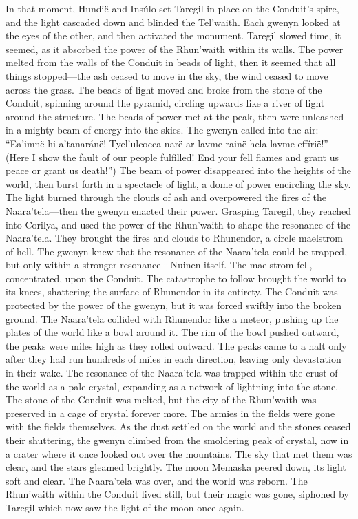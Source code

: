 \documentclass[smalldemyvopaper,11pt,twoside,onecolumn,openright,extrafontsizes]{memoir}
\begin{document}
In that moment, Hundië and Insúlo set Taregil in place on the Conduit’s spire, and the light cascaded down and blinded the Tel’waith. Each gwenyn looked at the eyes of the other, and then activated the monument. Taregil slowed time, it seemed, as it absorbed the power of the Rhun’waith within its walls. The power melted from the walls of the Conduit in beads of light, then it seemed that all things stopped—the ash ceased to move in the sky, the wind ceased to move across the grass. The beads of light moved and broke from the stone of the Conduit, spinning around the pyramid, circling upwards like a river of light around the structure. The beads of power met at the peak, then were unleashed in a mighty beam of energy into the skies. The gwenyn called into the air:
“Ea’imnë hi a’tanaránë! Tyel’ulcocca narë ar lavme rainë hela lavme effírië!”
(Here I show the fault of our people fulfilled! End your fell flames and grant us peace or grant us death!”)
	The beam of power disappeared into the heights of the world, then burst forth in a spectacle of light, a dome of power encircling the sky. The light burned through the clouds of ash and overpowered the fires of the Naara’tela—then the gwenyn enacted their power. Grasping Taregil, they reached into Corilya, and used the power of the Rhun’waith to shape the resonance of the Naara’tela. They brought the fires and clouds to Rhunendor, a circle maelstrom of hell. The gwenyn knew that the resonance of the Naara’tela could be trapped, but only within a stronger resonance—Nuinen itself. The maelstrom fell, concentrated, upon the Conduit. The catastrophe to follow brought the world to its knees, shattering the surface of Rhunendor in its entirety. The Conduit was protected by the power of the gwenyn, but it was forced swiftly into the broken ground. The Naara’tela collided with Rhunendor like a meteor, pushing up the plates of the world like a bowl around it. The rim of the bowl pushed outward, the peaks were miles high as they rolled outward. The peaks came to a halt only after they had run hundreds of miles in each direction, leaving only devastation in their wake. The resonance of the Naara’tela was trapped within the crust of the world as a pale crystal, expanding as a network of lightning into the stone. The stone of the Conduit was melted, but the city of the Rhun’waith was preserved in a cage of crystal forever more. The armies in the fields were gone with the fields themselves. As the dust settled on the world and the stones ceased their shuttering, the gwenyn climbed from the smoldering peak of crystal, now in a crater where it once looked out over the mountains. The sky that met them was clear, and the stars gleamed brightly. The moon Memaska peered down, its light soft and clear. The Naara’tela was over, and the world was reborn. The Rhun’waith within the Conduit lived still, but their magic was gone, siphoned by Taregil which now saw the light of the moon once again.
\end{document}
